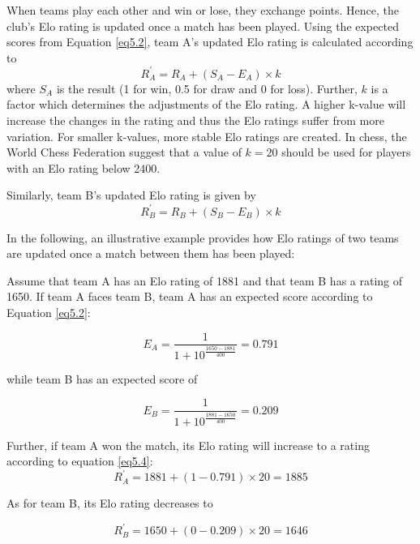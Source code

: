 \newpar
When teams play each other and win or lose, they exchange points. Hence, the club's Elo rating is updated once a match has been played. Using the expected scores from Equation \ref{eq5.2}, team A's updated Elo rating is calculated according to
\begin{equation} \label{eq5.4}
    R^{'}_A = R_A + (S_A-E_A) \times k
\end{equation}
where $S_A$ is the result (1 for win, 0.5 for draw and 0 for loss). Further, $k$ is a factor which determines the adjustments of the Elo rating. A higher k-value will increase the changes in the rating and thus the Elo ratings suffer from more variation. For smaller k-values, more stable Elo ratings are created. In chess, the World Chess Federation suggest that a value of $k = 20$ should be used for players with an Elo rating below 2400. 

\newpar

Similarly, team B's updated Elo rating is given by
\begin{equation} \label{eq5.5}
    R^{'}_B = R_B + (S_B-E_B) \times k
\end{equation}

\newpar

In the following, an illustrative example provides how Elo ratings of two teams are updated once a match between them has been played:

\newpar

Assume that team A has an Elo rating of 1881 and that team B has a rating of 1650. If team A faces team B, team A has an expected score according to Equation \ref{eq5.2}:

\begin{equation*}
    E_A = \frac{1}{1+10^{\frac{1650-1881}{400}}} = 0.791
\end{equation*}

while team B has an expected score of

\begin{equation*}
    E_B = \frac{1}{1+10^{\frac{1881-1650}{400}}} = 0.209
\end{equation*}

Further, if team A won the match, its Elo rating will increase to a rating according to equation \ref{eq5.4}: 
\begin{equation*}
   R^{'}_A= 1881 + (1-0.791) \times 20 = 1885
\end{equation*}

As for team B, its Elo rating decreases to

\begin{equation*}
   R^{'}_B = 1650 + (0-0.209) \times 20 = 1646 
\end{equation*}

